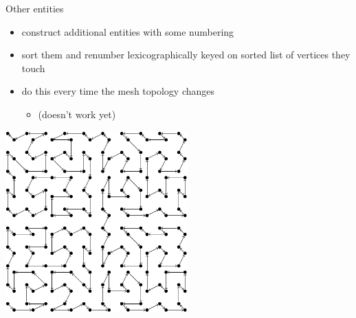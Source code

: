 \documentclass[presentation]{beamer}
\begin{document}
\begin{frame}[label={sec:orgheadline7}]{Other entities}
\begin{itemize}
\item construct additional entities with some numbering
\item sort them and renumber lexicographically keyed on sorted list of
vertices they touch
\item do this every time the mesh topology changes
\begin{itemize}
\item (doesn't work yet)
\end{itemize}
\end{itemize}
\begin{center}
\includegraphics[width=7cm]{03-18-FEniCS-mesh-numbering.figures/good-elements}
\end{center}
\end{frame}
\end{document}
